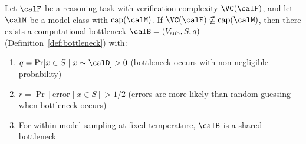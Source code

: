\begin{lemma}
\label{lem:hardness_bottleneck}
Let $\calF$ be a reasoning task with verification complexity $\VC(\calF)$, and let $\calM$ be a model class with $\mathrm{cap}(\calM)$.
If $\VC(\calF) \not\subseteq \mathrm{cap}(\calM)$, then there exists a computational bottleneck $\calB = (V_{\text{sub}}, S, q)$ (Definition~\ref{def:bottleneck}) with:
\begin{enumerate}[label=(\alph*)]
    \item $q = \Pr[x \in S \mid x \sim \calD] > 0$ (bottleneck occurs with non-negligible probability)
    \item $r = \Pr[\text{error} \mid x \in S] > 1/2$ (errors are more likely than random guessing when bottleneck occurs)
    \item For within-model sampling at fixed temperature, $\calB$ is a shared bottleneck
\end{enumerate}
\end{lemma}

